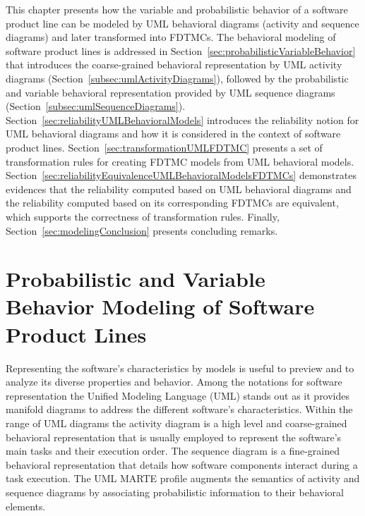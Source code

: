This chapter presents how the variable and probabilistic behavior of a software
product line can be modeled by UML behavioral diagrams (activity and sequence
diagrams) and later transformed into FDTMCs. The behavioral modeling of software
product lines is addressed in Section~\ref{sec:probabilisticVariableBehavior}
that introduces the coarse-grained behavioral representation by UML activity
diagrams (Section~\ref{subsec:umlActivityDiagrams}), followed by the
probabilistic and variable behavioral representation provided by UML sequence
diagrams (Section~\ref{subsec:umlSequenceDiagrams}).
Section~\ref{sec:reliabilityUMLBehavioralModels} introduces the reliability
notion for UML behavioral diagrams and how it is considered in the context of
software product lines. Section~\ref{sec:transformationUMLFDTMC} presents a set
of transformation rules for creating FDTMC models from UML behavioral models.
Section~\ref{sec:reliabilityEquivalenceUMLBehavioralModelsFDTMCs} demonstrates
evidences that the reliability computed based on UML behavioral diagrams and the
reliability computed based on its corresponding FDTMCs are equivalent, which
supports the correctness of transformation rules. Finally,
Section~\ref{sec:modelingConclusion} presents concluding remarks.










\section{Probabilistic and Variable Behavior Modeling of Software Product Lines
	\label{sec:probabilisticVariableBehavior}}

Representing the software's characteristics by models is useful to preview
and to analyze its diverse properties and behavior. Among the notations for
software representation the Unified Modeling Language (UML) stands out as it
provides manifold diagrams to address the different software's characteristics.
Within the range of UML diagrams the activity diagram is a high level and coarse-grained
behavioral representation that is usually employed to represent  the
software's main tasks and their execution order. The sequence diagram is a
fine-grained behavioral representation that details how software
components interact during a task execution. The UML MARTE profile augments the
semantics of activity and sequence diagrams by associating probabilistic
information to their behavioral elements.

